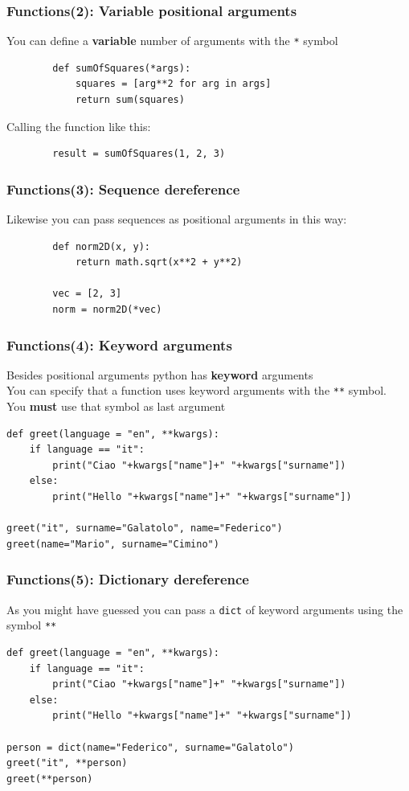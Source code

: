 \documentclass{beamer}
\begin{document}
\begin{frame}[fragile]
    \frametitle{Functions(2): Variable positional arguments}
    You can define a \textbf{variable} number of arguments with the \texttt{*} symbol
    \begin{verbatim}
        def sumOfSquares(*args):
            squares = [arg**2 for arg in args]
            return sum(squares)
    \end{verbatim}
    Calling the function like this:
    \begin{verbatim}
        result = sumOfSquares(1, 2, 3)
    \end{verbatim}
\end{frame}

\begin{frame}[fragile]
    \frametitle{Functions(3): Sequence dereference}
    Likewise you can pass sequences as positional arguments in this way:  
    \begin{verbatim}
        def norm2D(x, y):
            return math.sqrt(x**2 + y**2)
        
        vec = [2, 3]
        norm = norm2D(*vec)
    \end{verbatim}
\end{frame}

\begin{frame}[fragile]
    \frametitle{Functions(4): Keyword arguments}
    Besides positional arguments python has \textbf{keyword} arguments\\
    You can specify that a function uses keyword arguments with the \texttt{**} symbol.\\
    You \textbf{must} use that symbol as last argument  
    \begin{verbatim}
def greet(language = "en", **kwargs):
    if language == "it":
        print("Ciao "+kwargs["name"]+" "+kwargs["surname"])
    else:
        print("Hello "+kwargs["name"]+" "+kwargs["surname"])

greet("it", surname="Galatolo", name="Federico")
greet(name="Mario", surname="Cimino")
    \end{verbatim}
\end{frame}

\begin{frame}[fragile]
    \frametitle{Functions(5): Dictionary dereference}
    As you might have guessed you can pass a \texttt{dict} of keyword arguments using the symbol \texttt{**}
    \begin{verbatim}
def greet(language = "en", **kwargs):
    if language == "it":
        print("Ciao "+kwargs["name"]+" "+kwargs["surname"])
    else:
        print("Hello "+kwargs["name"]+" "+kwargs["surname"])

person = dict(name="Federico", surname="Galatolo")
greet("it", **person)
greet(**person)
    \end{verbatim}
\end{frame}
\end{document}
